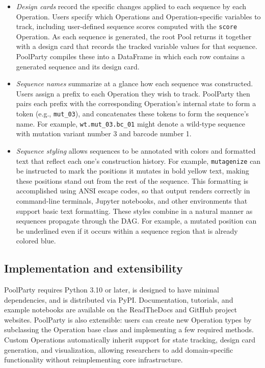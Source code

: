 \begin{itemize}
\item \emph{Design cards} record the specific changes applied to each sequence by each Operation. Users specify which Operations and Operation-specific variables to track, including user-defined sequence scores computed with the \texttt{score} Operation. As each sequence is generated, the root Pool returns it together with a design card that records the tracked variable values for that sequence. PoolParty compiles these into a DataFrame in which each row contains a generated sequence and its design card.

\item \emph{Sequence names} summarize at a glance how each sequence was constructed. Users assign a prefix to each Operation they wish to track. PoolParty then pairs each prefix with the corresponding Operation's internal state to form a token (e.g., \texttt{mut\_03}), and concatenates these tokens to form the sequence's name. For example, \texttt{wt.mut\_03.bc\_01} might denote a wild-type sequence with mutation variant number 3 and barcode number 1.

\item \emph{Sequence styling} allows sequences to be annotated with colors and formatted text that reflect each one's construction history. For example, \texttt{mutagenize} can be instructed to mark the positions it mutates in bold yellow text, making these positions stand out from the rest of the sequence. This formatting is accomplished using ANSI escape codes, so that output renders correctly in command-line terminals, Jupyter notebooks, and other environments that support basic text formatting. These styles combine in a natural manner as sequences propagate through the DAG. For example, a mutated position can be underlined even if it occurs within a sequence region that is already colored blue.
\end{itemize}


\subsection*{Implementation and extensibility}\label{subsec:implementation-and-extensibility}

PoolParty requires Python 3.10 or later, is designed to have minimal dependencies, and is distributed via PyPI. Documentation, tutorials, and example notebooks are available on the ReadTheDocs and GitHub project websites. PoolParty is also extensible: users can create new Operation types by subclassing the Operation base class and implementing a few required methods. Custom Operations automatically inherit support for state tracking, design card generation, and visualization, allowing researchers to add domain-specific functionality without reimplementing core infrastructure.

